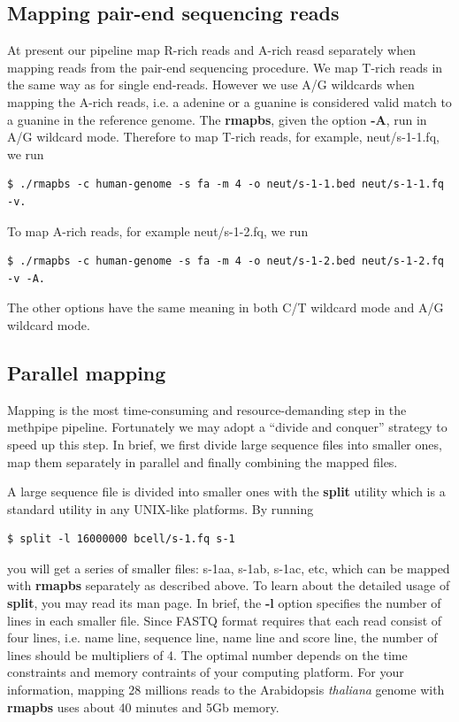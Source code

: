 \documentclass{article}
\begin{document}
\subsection{Mapping pair-end sequencing reads}
\label{sec:mapping-pair-end}
At present our pipeline map R-rich reads and A-rich reasd separately
when mapping reads from the pair-end sequencing procedure. We map
T-rich reads in the same way as for single end-reads. However we use
A/G wildcards when mapping the A-rich reads, i.e. a adenine or a
guanine is considered valid match to a guanine in the reference
genome. The \textbf{rmapbs}, given the option \textbf{-A}, run in A/G
wildcard mode. Therefore to map T-rich reads, for example,
neut/s-1-1.fq, we run
\begin{verbatim}
$ ./rmapbs -c human-genome -s fa -m 4 -o neut/s-1-1.bed neut/s-1-1.fq -v. 
\end{verbatim}
To map A-rich reads, for example neut/s-1-2.fq, we run 
\begin{verbatim}
$ ./rmapbs -c human-genome -s fa -m 4 -o neut/s-1-2.bed neut/s-1-2.fq -v -A. 
\end{verbatim}
The other options have the same meaning in both C/T wildcard mode and
A/G wildcard mode.   

\subsection{Parallel mapping}
\label{sec:parallel-mapping}
Mapping is the most time-consuming and resource-demanding step in the
methpipe pipeline. Fortunately we may adopt a ``divide and conquer''
strategy to speed up this step.  In brief, we first divide large
sequence files into smaller ones, map them separately in parallel and
finally combining the mapped files.

A large sequence file is divided into smaller ones with the
\textbf{split} utility which is a standard utility in any UNIX-like
platforms. By running
\begin{verbatim}
$ split -l 16000000 bcell/s-1.fq s-1
\end{verbatim}
you will get a series of smaller files: s-1aa, s-1ab, s-1ac, etc,
which can be mapped with \textbf{rmapbs} separately as described
above. To learn about the detailed usage of \textbf{split}, you may
read its man page. In brief, the \textbf{-l} option specifies the
number of lines in each smaller file. Since FASTQ format requires that
each read consist of four lines, i.e. name line, sequence line, name
line and score line, the number of lines should be multipliers of
4. The optimal number depends on the time constraints and memory
contraints of your computing platform. For your information, mapping
$28$ millions reads to the Arabidopsis \textit{thaliana} genome with
\textbf{rmapbs} uses about 40 minutes and 5Gb memory. 
\end{document}
